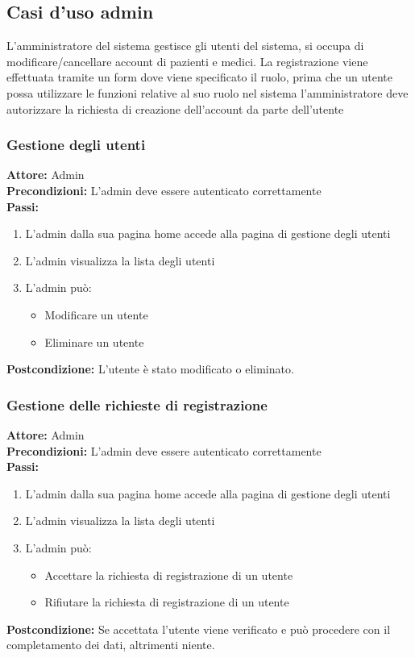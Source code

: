 \documentclass{article}
\begin{document}
\subsection{Casi d'uso admin}
L'amministratore del sistema gestisce gli utenti del sistema, si occupa di modificare/cancellare account di pazienti e medici. La registrazione viene effettuata tramite un form dove viene specificato il ruolo, prima che un utente possa utilizzare le funzioni relative al suo ruolo nel sistema l'amministratore deve autorizzare la richiesta di creazione dell'account da parte dell'utente


\subsubsection{Gestione degli utenti}
\begin{mdframed}
   \textbf{Attore:} Admin \\
   \textbf{Precondizioni:} L'admin deve essere autenticato correttamente \\
   \textbf{Passi:}
   \begin{enumerate}
       \item L'admin dalla sua pagina home accede alla pagina di gestione degli utenti
       \item L'admin visualizza la lista degli utenti
       \item L'admin può:
       \begin{itemize}
           \item Modificare un utente
           \item Eliminare un utente
       \end{itemize}
   \end{enumerate}
   \textbf{Postcondizione:} L'utente è stato modificato o eliminato.
\end{mdframed}


\subsubsection{Gestione delle richieste di registrazione}
\begin{mdframed}
   \textbf{Attore:} Admin \\
   \textbf{Precondizioni:} L'admin deve essere autenticato correttamente \\
   \textbf{Passi:}
   \begin{enumerate}
       \item L'admin dalla sua pagina home accede alla pagina di gestione degli utenti
       \item L'admin visualizza la lista degli utenti
       \item L'admin può:
       \begin{itemize}
           \item Accettare la richiesta di registrazione di un utente
           \item Rifiutare la richiesta di registrazione di un utente
       \end{itemize}
   \end{enumerate}
   \textbf{Postcondizione:} Se accettata l'utente viene verificato e può procedere con il completamento dei dati, altrimenti niente.
\end{mdframed}
\end{document}
